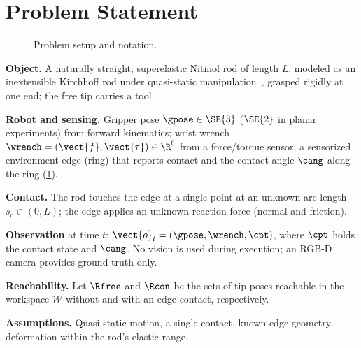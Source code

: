 \section{Problem Statement}
\label{sec:problem}

\begin{figure}[t]
  \centering
  \caption{Problem setup and notation.}
  \label{fig:notation}
\end{figure}

\begin{outline}
  \item \textbf{Object.} A naturally straight, superelastic Nitinol rod of
    length $L$, modeled as an inextensible Kirchhoff rod under quasi-static
    manipulation~\cite{bretl2014quasistatic}, grasped rigidly at one end; the
    free tip carries a tool. 
  \item \textbf{Robot and sensing.} Gripper pose $\gpose\in\SE{3}$ ($\SE{2}$
    in planar experiments) from forward kinematics; wrist wrench
    $\wrench=(\vect{f},\vect{\tau})\in\R^{6}$ from a force/torque sensor; a
    sensorized environment edge (ring) that reports contact and the contact
    angle $\cang$ along the ring (\cref{fig:notation}).
  \item \textbf{Contact.} The rod touches the edge at a single point at an
    unknown arc length $s_{\mathrm{c}}\in(0,L)$; the edge applies an unknown
    reaction force (normal and friction). 
  \item \textbf{Observation} at time $t$: $\vect{o}_t=(\gpose,\wrench,\cpt)$,
    where $\cpt$ holds the contact state and $\cang$. No vision is used during
    execution; an RGB-D camera provides ground truth only.
  \item \textbf{Reachability.} Let $\Rfree$ and $\Rcon$ be the sets of tip
    poses reachable in the workspace $\mathcal{W}$ without and with an edge
    contact, respectively.
  \item \textbf{Assumptions.} Quasi-static motion, a single contact, known edge
    geometry, deformation within the rod's elastic range.
\end{outline}

